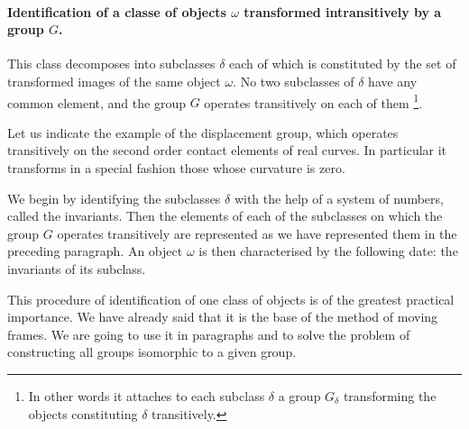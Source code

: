 \paragraph{Identification of a classe of objects $\omega$ transformed intransitively by a group $G$.}
\label{sec:94}
This class decomposes into subclasses $\delta$ each of which is constituted by the set of transformed images of the same object $\omega$. No two subclasses of $\delta$ have any common element, and the group $G$ operates transitively on each of them \footnote{In other words it attaches to each subclass $\delta$ a group $G_{\delta}$ transforming the objects constituting $\delta$ transitively.}.

\somespace
{\small Let us indicate the example of the displacement group, which operates transitively on the second order contact elements of real curves. In particular it transforms in a special fashion those whose curvature is zero.
}

\somespace

We begin by identifying the subclasses $\delta$ with the help of a system of numbers, called the invariants. Then the elements of each of the subclasses on which the group $G$ operates transitively are represented as we have represented them in the preceding paragraph. An object $\omega$ is then characterised by the following date: the invariants of its subclass.

This procedure of identification of one class of objects is of the greatest practical importance. We have already said that it is the base of the method of moving frames. We are going to use it in paragraphs  and  to solve the problem of constructing all groups isomorphic to a given group.

